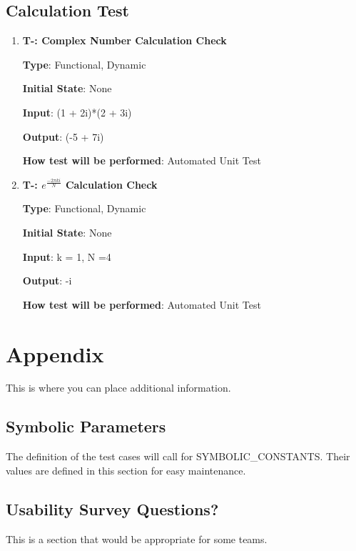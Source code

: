 \documentclass[12pt, titlepage]{article}
\newcounter{tnum}
\begin{document}
\subsection{Calculation Test}

\begin{enumerate}

\item{\textbf{T-\thetnum \label{CCC}: Complex Number Calculation Check}}

\textbf {Type}: Functional, Dynamic
					
\textbf {Initial State}: None
					
\textbf {Input}: (1 + 2i)*(2 + 3i)
					
\textbf {Output}: (-5 + 7i)
					
\textbf {How test will be performed}: Automated Unit Test


\item{\textbf{T-\thetnum \label{FZ}: $e^{\frac{-2\pi ki}{N}}$ Calculation Check}}

\textbf {Type}: Functional, Dynamic
					
\textbf {Initial State}: None
					
\textbf {Input}: k = 1, N =4
					
\textbf {Output}: -i
					
\textbf {How test will be performed}:  Automated Unit Test

\end{enumerate}	






\newpage

\section{Appendix}

This is where you can place additional information.

\subsection{Symbolic Parameters}

The definition of the test cases will call for SYMBOLIC\_CONSTANTS.
Their values are defined in this section for easy maintenance.

\subsection{Usability Survey Questions?}

This is a section that would be appropriate for some teams.
\end{document}
